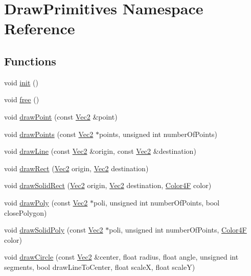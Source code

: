 \hypertarget{namespaceDrawPrimitives}{}\section{Draw\+Primitives Namespace Reference}
\label{namespaceDrawPrimitives}
\subsection*{Functions}
\begin{DoxyCompactItemize}
\item 
void \hyperlink{namespaceDrawPrimitives_ae042e1546ce595f9b01f92bcac0be48a}{init} ()
\item 
void \hyperlink{namespaceDrawPrimitives_a1a20eab15f5a2560e8ebaa1fddde8216}{free} ()
\item 
void \hyperlink{namespaceDrawPrimitives_a8245dd1018a768473478a9e65c7be6d5}{draw\+Point} (const \hyperlink{classVec2}{Vec2} \&point)
\item 
void \hyperlink{namespaceDrawPrimitives_a69ac036b04c0dd7b20643a777bfdde14}{draw\+Points} (const \hyperlink{classVec2}{Vec2} $\ast$points, unsigned int number\+Of\+Points)
\item 
void \hyperlink{namespaceDrawPrimitives_a872bfe0f92313b81a93eb7e6ae67b94a}{draw\+Line} (const \hyperlink{classVec2}{Vec2} \&origin, const \hyperlink{classVec2}{Vec2} \&destination)
\item 
void \hyperlink{namespaceDrawPrimitives_af083f4157bcb6c95fa9755c275c851d4}{draw\+Rect} (\hyperlink{classVec2}{Vec2} origin, \hyperlink{classVec2}{Vec2} destination)
\item 
void \hyperlink{namespaceDrawPrimitives_ae71825a1fd3fafd9d83ddaf78bc4b84f}{draw\+Solid\+Rect} (\hyperlink{classVec2}{Vec2} origin, \hyperlink{classVec2}{Vec2} destination, \hyperlink{structColor4F}{Color4F} color)
\item 
void \hyperlink{namespaceDrawPrimitives_a71a680302a9b336b8ddb39bf5b18348c}{draw\+Poly} (const \hyperlink{classVec2}{Vec2} $\ast$poli, unsigned int number\+Of\+Points, bool close\+Polygon)
\item 
void \hyperlink{namespaceDrawPrimitives_a236c83afa9808359e7f445778973fdd1}{draw\+Solid\+Poly} (const \hyperlink{classVec2}{Vec2} $\ast$poli, unsigned int number\+Of\+Points, \hyperlink{structColor4F}{Color4F} color)
\item 
void \hyperlink{namespaceDrawPrimitives_ab3372bf8fe32fedeffc8867ce741f5c0}{draw\+Circle} (const \hyperlink{classVec2}{Vec2} \&center, float radius, float angle, unsigned int segments, bool draw\+Line\+To\+Center, float scaleX, float scaleY)

\end{DoxyCompactItemize}
